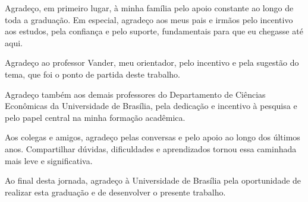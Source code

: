 \begin{agradecimentos}

Agradeço, em primeiro lugar, à minha família pelo apoio constante ao longo de toda a graduação. Em especial, agradeço aos meus pais e irmãos pelo incentivo aos estudos, pela confiança e pelo suporte, fundamentais para que eu chegasse até aqui.

Agradeço ao professor Vander, meu orientador, pelo incentivo e pela sugestão do tema, que foi o ponto de partida deste trabalho.

Agradeço também aos demais professores do Departamento de Ciências Econômicas da Universidade de Brasília, pela dedicação e incentivo à pesquisa e pelo papel central na minha formação acadêmica.

Aos colegas e amigos, agradeço pelas conversas e pelo apoio ao longo dos últimos anos. Compartilhar dúvidas, dificuldades e aprendizados tornou essa caminhada mais leve e significativa.

Ao final desta jornada, agradeço à Universidade de Brasília pela oportunidade de realizar esta graduação e de desenvolver o presente trabalho.


\end{agradecimentos}